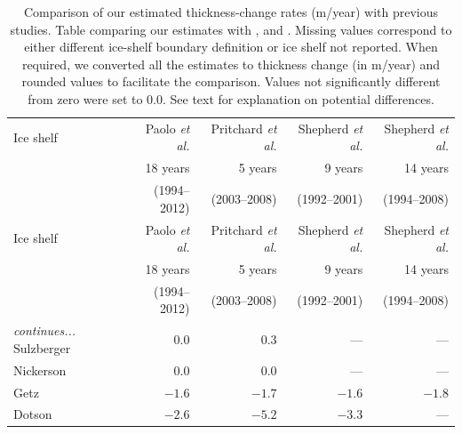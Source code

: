 \clearpage
\begin{footnotesize}
\begin{longtable}{lrrrr} 
\caption[Comparison of our estimates with previous studies]{
Comparison of our estimated thickness-change rates (m/year) with previous studies. Table comparing our estimates \parencite{Paolo2015} with \textcite{Pritchard2012}, \textcite{Shepherd2010} and \textcite{Shepherd2004}. Missing values correspond to either different ice-shelf boundary definition or ice shelf not reported. When required, we converted all the estimates to thickness change (in m/year) and rounded values to facilitate the comparison. Values not significantly different from zero were set to 0.0. See text for explanation on potential differences.
}\\

\hline
Ice shelf       & Paolo {\it et al.}\footnotemark[1] & Pritchard {\it et al.}\footnotemark[2]   & Shepherd {\it et al.}\footnotemark[3] & Shepherd {\it et al.}\footnotemark[4] \\
                & 18 years               & 5 years                      & 9 years                   & 14 years                  \\
                & (1994--2012)           & (2003--2008)                 & (1992--2001)              & (1994--2008)              \\
\hline
\endfirsthead   %
\hline
Ice shelf       & Paolo {\it et al.}\footnotemark[1] & Pritchard {\it et al.}\footnotemark[2]   & Shepherd {\it et al.}\footnotemark[3] & Shepherd {\it et al.}\footnotemark[4] \\
                & 18 years               & 5 years                      & 9 years                   & 14 years                  \\
                & (1994--2012)           & (2003--2008)                 & (1992--2001)              & (1994--2008)              \\
\hline
\endhead        %
\hline
{\it continues...}
\endfoot        %
\hline
\endlastfoot    %
%
Sulzberger     & $0.0 $ & $0.3 $ &  ---   &  ---    \\
Nickerson      & $0.0 $ & $0.0 $ &  ---   &  ---    \\	
Getz	       & $-1.6$ & $-1.7$ & $-1.6$ & $-1.8 $ \\
Dotson	       & $-2.6$ & $-5.2$ & $-3.3$ &  ---    \\

\end{longtable}
\end{footnotesize}

